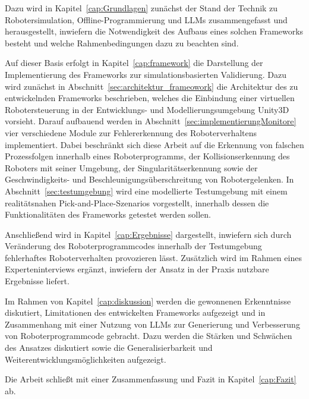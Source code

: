 Dazu wird in Kapitel~\ref{cap:Grundlagen} zunächst der Stand
der Technik zu
Robotersimulation, Offline-Programmierung und LLMs zusammengefasst und
herausgestellt, inwiefern die Notwendigkeit des Aufbaus eines solchen Frameworks
besteht und welche Rahmenbedingungen dazu zu beachten sind.

Auf dieser Basis erfolgt in Kapitel~\ref{cap:framework} die
Darstellung der Implementierung des Frameworks zur
simulationsbasierten Validierung. Dazu wird zunächst in
Abschnitt~\ref{sec:architektur_frameowork} die Architektur des zu
entwickelnden Frameworks
beschrieben, welches die Einbindung einer virtuellen Robotersteuerung
in der Entwicklungs- und Modellierungsumgebung Unity3D vorsieht.
Darauf aufbauend werden in Abschnitt~\ref{sec:implementierungMonitore}
vier verschiedene Module zur Fehlererkennung des Roboterverhaltens
implementiert. Dabei beschränkt sich diese Arbeit auf die Erkennung von falschen
Prozessfolgen innerhalb eines Roboterprogramms, der
Kollisionserkennung des Roboters mit seiner Umgebung, der
Singularitätserkennung sowie der Geschwindigkeits- und
Beschleunigungsüberschreitung von Robotergelenken.
In Abschnitt~\ref{sec:testumgebung} wird eine modellierte Testumgebung mit einem
realitätsnahen Pick-and-Place-Szenarios vorgestellt, innerhalb dessen die
Funktionalitäten des Frameworks getestet werden sollen.

Anschließend wird in Kapitel~\ref{cap:Ergebnisse} dargestellt,
inwiefern sich durch Veränderung des
Roboterprogrammcodes innerhalb der Testumgebung fehlerhaftes
Roboterverhalten provozieren lässt. Zusätzlich wird im Rahmen eines
Experteninterviews ergänzt, inwiefern der Ansatz in
der Praxis nutzbare Ergebnisse liefert.

Im Rahmen von Kapitel~\ref{cap:diskussion} werden die gewonnenen
Erkenntnisse diskutiert, Limitationen des entwickelten Frameworks
aufgezeigt und in
Zusammenhang mit einer Nutzung von LLMs zur Generierung und
Verbesserung von Roboterprogrammcode gebracht. Dazu werden die Stärken und
Schwächen des Ansatzes diskutiert sowie die Generalisierbarkeit und
Weiterentwicklungsmöglichkeiten aufgezeigt.

Die Arbeit schließt mit einer Zusammenfassung und Fazit in
Kapitel~\ref{cap:Fazit} ab.
